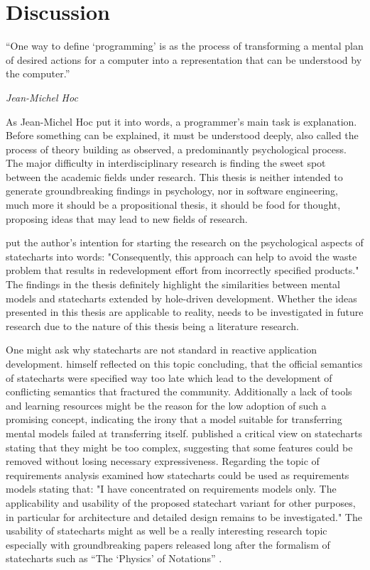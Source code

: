 \chapter{Discussion}
\label{chap:discussion}
\epigraph{``One way to define `programming' is as the process of transforming a mental plan of desired actions for a computer into a representation that can be understood by the computer.''}{\textit{Jean-Michel Hoc}}
As Jean-Michel Hoc put it into words, a programmer's main task is explanation.
Before something can be explained, it must be understood deeply, also called the process of theory building as \textcite{naur_programming_1985} observed, a predominantly psychological process.
The major difficulty in interdisciplinary research is finding the sweet spot between the academic fields under research.
This thesis is neither intended to generate groundbreaking findings in psychology, nor in software engineering, much more it should be a propositional thesis, it should be food for thought, proposing ideas that may lead to new fields of research.

\textcite[10]{sheldon_software_2000} put the author's intention for starting the research on the psychological aspects of statecharts into words: "Consequently, this approach can help to avoid the waste problem that results in redevelopment effort from incorrectly specified products."
The findings in the thesis definitely highlight the similarities between mental models and statecharts extended by hole-driven development.
Whether the ideas presented in this thesis are applicable to reality, needs to be investigated in future research due to the nature of this thesis being a literature research.

One might ask why statecharts are not standard in reactive application development.
\textcite{harel_statecharts_2007} himself reflected on this topic concluding, that the official semantics of statecharts were specified way too late which lead to the development of conflicting semantics that fractured the community.
Additionally a lack of tools and learning resources might be the reason for the low adoption of such a promising concept, indicating the irony that a model suitable for transferring mental models failed at transferring itself.
\textcite{breen_statecharts_2004} published a critical view on statecharts stating that they might be too complex, suggesting that some features could be removed without losing necessary expressiveness.
Regarding the topic of requirements analysis \textcite{glinz_statecharts_2002} examined how statecharts could be used as requirements models stating that: "I have concentrated on requirements models only. The applicability and usability of the proposed statechart variant for other purposes, in particular for architecture and detailed design remains to be investigated." \autocite[5]{glinz_statecharts_2002}
The usability of statecharts might as well be a really interesting research topic especially with groundbreaking papers released long after the formalism of statecharts such as ``The `Physics' of Notations'' \autocite{moody_physics_2009}.

